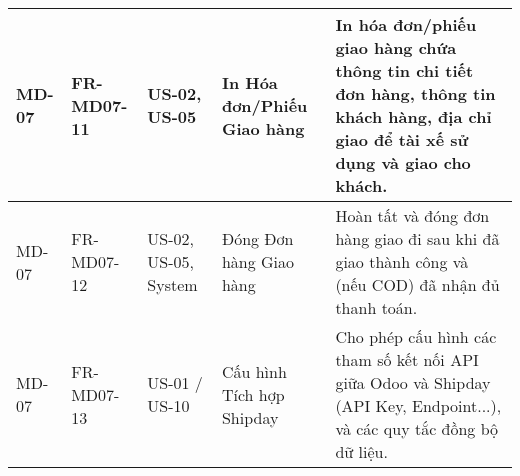 \begin{longtable}{|m{2cm}|m{2.5cm}|m{2.5cm}|m{4.5cm}|m{4cm}|}
\hline
MD-07 & FR-MD07-11 & US-02, US-05 & In Hóa đơn/Phiếu Giao hàng & In hóa đơn/phiếu giao hàng chứa thông tin chi tiết đơn hàng, thông tin khách hàng, địa chỉ giao để tài xế sử dụng và giao cho khách. \\
\hline
MD-07 & FR-MD07-12 & US-02, US-05, System & Đóng Đơn hàng Giao hàng & Hoàn tất và đóng đơn hàng giao đi sau khi đã giao thành công và (nếu COD) đã nhận đủ thanh toán. \\
\hline
MD-07 & FR-MD07-13 & US-01 / US-10 & Cấu hình Tích hợp Shipday & Cho phép cấu hình các tham số kết nối API giữa Odoo và Shipday (API Key, Endpoint...), và các quy tắc đồng bộ dữ liệu. \\
\hline

\end{longtable}

